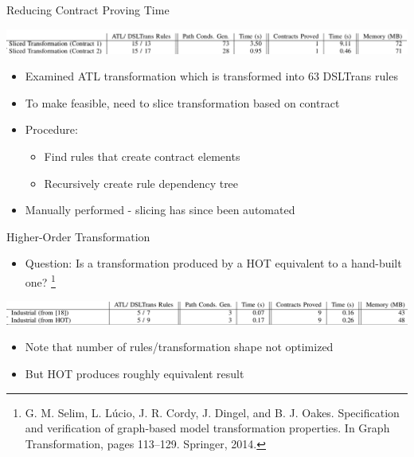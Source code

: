 \documentclass[xcolor=dvipsnames, 12pt]{beamer}
\newcommand\blfootnote[1]{%
  \begingroup
  \renewcommand\thefootnote{}\footnote{#1}%
  \addtocounter{footnote}{-1}%
  \endgroup
}
\begin{document}
\begin{frame}{Reducing Contract Proving Time}
\begin{center}
\includegraphics[width=\textwidth]{figures/middle_table_2}
\end{center}
\begin{itemize}[<+->]
\item Examined ATL transformation which is transformed into 63 DSLTrans rules
\item To make feasible, need to slice transformation based on contract
\item Procedure:
\begin{itemize}[<+->]
\item Find rules that create contract elements
\item Recursively create rule dependency tree
\end{itemize}
\item Manually performed - slicing has since been automated
\end{itemize}
\end{frame}

\begin{frame}{Higher-Order Transformation}
\begin{itemize}
\item Question: Is a transformation produced by a HOT equivalent to a hand-built one?\blfootnote{G. M. Selim, L. Lúcio, J. R. Cordy, J. Dingel, and B. J. Oakes. Specification and verification of graph-based model transformation properties.
In Graph Transformation, pages 113–129. Springer, 2014.}
\end{itemize}
\pause
\begin{center}
\includegraphics[width=\textwidth]{figures/bottom_table_2}
\end{center}
\pause
\begin{itemize}
\item Note that number of rules/transformation shape not optimized
\item But HOT produces roughly equivalent result 
\end{itemize}
\end{frame}

\end{document}

